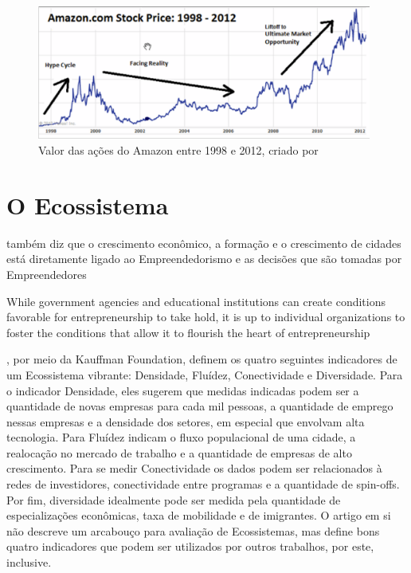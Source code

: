 \begin{figure}[!htb]
\centering
\includegraphics[width=11cm,angle=0]{figuras/stock_market_amazon}
\caption{Valor das ações do Amazon entre 1998 e 2012, criado por \cite{Pepper2012}}
\label{Rotulo}
\end{figure}

\section{O Ecossistema}
\label{section:ecossistemas_e_suas_pecas}

 também diz que o crescimento econômico, a formação e o crescimento de cidades está diretamente ligado ao Empreendedorismo e as decisões que são tomadas por Empreendedores

While government agencies and educational institutions can create conditions favorable for entrepreneurship to take hold, it is up to individual organizations to foster the conditions that allow it to flourish the heart of entrepreneurship

, por meio da Kauffman Foundation, definem os quatro seguintes indicadores de um Ecossistema vibrante: Densidade, Fluídez, Conectividade e Diversidade. Para o indicador Densidade, eles sugerem que medidas indicadas podem ser a quantidade de novas empresas para cada mil pessoas, a quantidade de emprego nessas empresas e a densidade dos setores, em especial que envolvam alta tecnologia. Para Fluídez indicam o fluxo populacional de uma cidade, a realocação no mercado de trabalho e a quantidade de empresas de alto crescimento. Para se medir Conectividade os dados podem ser relacionados à redes de investidores, conectividade entre programas e a quantidade de spin-offs. Por fim, diversidade idealmente pode ser medida pela quantidade de especializações econômicas, taxa de mobilidade e de imigrantes. O artigo em si não descreve um arcabouço para avaliação de Ecossistemas, mas define bons quatro indicadores que podem ser utilizados por outros trabalhos, por este, inclusive. 

